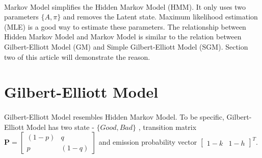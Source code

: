 \documentclass[11pt]{article}
\begin{document}
    \paragraph{}
    Markov Model simplifies the Hidden Markov Model (HMM). It only uses two parameters $\{A,\pi\}$ and removes the Latent state. Maximum likelihood estimation (MLE) is a good way to 
    estimate these parameters. The relationship between Hidden Markov Model and Markov Model is similar to the relation between Gilbert-Elliott Model (GM) and Simple Gilbert-Elliott Model (SGM). Section two of this article will demonstrate the reason. 
    \section{Gilbert-Elliott Model}
    \paragraph{}Gilbert-Elliott Model resembles Hidden Markov Model. 
To be specific, Gilbert-Elliott Model has two state - $\{Good, Bad\}$ , 
transition matrix $\boldsymbol{P}=\left[\begin{array}{cc}(1-p) & q \\ p & (1-q)\end{array}\right]$ and 
emission probability vector $\left[\begin{array}{cc}1-k&1-h\end{array}\right]^T$.
\end{document}
